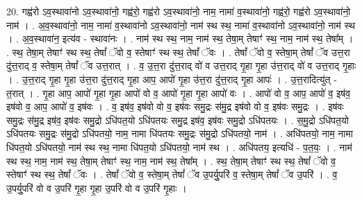 \documentclass[17pt]{extarticle}
\begin{document}
20. गह्व॑रो ऽव॒स्थावा॑नो ऽव॒स्थावा॑नो॒ गह्व॑रो॒ गह्व॑रो ऽव॒स्थावा॑नो॒ नाम॒ नामा॑ व॒स्थावा॑नो॒ गह्व॑रो॒ गह्व॑रो ऽव॒स्थावा॑नो॒ नाम॑ । . अ॒व॒स्थावा॑नो॒ नाम॒ नामा॑ व॒स्थावा॑नो ऽव॒स्थावा॑नो॒ नाम॑ स्थ स्थ॒ नामा॑ व॒स्थावा॑नो ऽव॒स्थावा॑नो॒ नाम॑ स्थ । . अ॒व॒स्थावा॑न॒ इत्य॑व - स्थावा॑नः । . नाम॑ स्थ स्थ॒ नाम॒ नाम॑ स्थ॒ तेषा॒म् तेषाꣳ॑ स्थ॒ नाम॒ नाम॑ स्थ॒ तेषा᳚म् । . स्थ॒ तेषा॒म् तेषाꣳ॑ स्थ स्थ॒ तेषां᳚ ॅवो व॒ स्तेषाꣳ॑ स्थ स्थ॒ तेषां᳚ ॅवः । . तेषां᳚ ॅवो व॒ स्तेषा॒म् तेषां᳚ ॅव उत्त॒रा दु॑त्त॒राद् व॒ स्तेषा॒म् तेषां᳚ ॅव उत्त॒रात् । . व॒ उ॒त्त॒रा दु॑त्त॒राद् वो॑ व उत्त॒राद् गृ॒हा गृ॒हा उ॑त्त॒राद् वो॑ व उत्त॒राद् गृ॒हाः । . उ॒त्त॒राद् गृ॒हा गृ॒हा उ॑त्त॒रा दु॑त्त॒राद् गृ॒हा आप॒ आपो॑ गृ॒हा उ॑त्त॒रा दु॑त्त॒राद् गृ॒हा आपः॑ । . उ॒त्त॒रादित्यु॑त् - त॒रात् । . गृ॒हा आप॒ आपो॑ गृ॒हा गृ॒हा आपो॑ वो व॒ आपो॑ गृ॒हा गृ॒हा आपो॑ वः । . आपो॑ वो व॒ आप॒ आपो॑ व॒ इष॑व॒ इष॑वो व॒ आप॒ आपो॑ व॒ इष॑वः । . व॒ इष॑व॒ इष॑वो वो व॒ इष॑वः समु॒द्रः स॑मु॒द्र इष॑वो वो व॒ इष॑वः समु॒द्रः । . इष॑वः समु॒द्रः स॑मु॒द्र इष॑व॒ इष॑वः समु॒द्रो ऽधि॑पत॒यो ऽधि॑पतयः समु॒द्र इष॑व॒ इष॑वः समु॒द्रो ऽधि॑पतयः । . स॒मु॒द्रो ऽधि॑पत॒यो ऽधि॑पतयः समु॒द्रः स॑मु॒द्रो ऽधि॑पतयो॒ नाम॒ नामा धि॑पतयः समु॒द्रः स॑मु॒द्रो ऽधि॑पतयो॒ नाम॑ । . अधि॑पतयो॒ नाम॒ नामा धि॑पत॒यो ऽधि॑पतयो॒ नाम॑ स्थ स्थ॒ नामा धि॑पत॒यो ऽधि॑पतयो॒ नाम॑ स्थ । . अधि॑पतय॒ इत्यधि॑ - प॒त॒यः॒ । . नाम॑ स्थ स्थ॒ नाम॒ नाम॑ स्थ॒ तेषा॒म् तेषाꣳ॑ स्थ॒ नाम॒ नाम॑ स्थ॒ तेषा᳚म् । . स्थ॒ तेषा॒म् तेषाꣳ॑ स्थ स्थ॒ तेषां᳚ ॅवो व॒ स्तेषाꣳ॑ स्थ स्थ॒ तेषां᳚ ॅवः । . तेषां᳚ ॅवो व॒ स्तेषा॒म् तेषां᳚ ॅव उ॒पर्यु॒परि॑ व॒ स्तेषा॒म् तेषां᳚ ॅव उ॒परि॑ । . व॒ उ॒पर्यु॒परि॑ वो व उ॒परि॑ गृ॒हा गृ॒हा उ॒परि॑ वो व उ॒परि॑ गृ॒हाः । \newline
\end{document}
